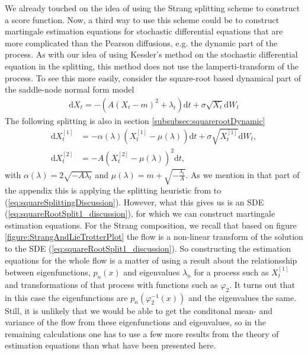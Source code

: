 We already touched on the idea of using the Strang splitting scheme to construct a score function. Now, a third way to use this scheme could be to construct martingale estimation equations for stochastic differential equations that are more complicated than the Pearson diffusions, e.g. the dynamic part of the process. As with our idea of using Kessler's method on the stochastic differential equation in the splitting, this method does not use the lamperti-transform of the process. To see this more easily, consider the square-root based dynamical part of the saddle-node normal form model
\begin{align}
    \mathrm{d}X_t = -(A(X_t - m)^2 + \lambda_t)\mathrm{d}t + \sigma\sqrt{X_t}\mathrm{d}W_t \label{eq:squareSplittingDiscussion}
\end{align}  
The following splitting is also in section \ref{subsubsec:squarerootDynamic}
\begin{align}
    \mathrm{d}X_t^{[1]} &= -\alpha(\lambda)\left(X_t^{[1]} - \mu(\lambda)\right)  \mathrm{d}t + \sigma \sqrt{X_t^{[1]}} \mathrm{d}W_t, \label{eq:squareRootSplit1_discussion} \\
    \mathrm{d}X_t^{[2]} &= - A \left(X_t^{[2]} - \mu(\lambda)\right)^2 \mathrm{d}t, \label{eq:squareRootSplit2_discussion}
\end{align}
with $\alpha(\lambda) = 2\sqrt{-A\lambda_t}$ and $\mu(\lambda) = m + \sqrt{-\frac{\lambda_t}{A}}$. As we mention in that part of the appendix this is applying the splitting heuristic from \cite{SplittingSchemes} to (\ref{eq:squareSplittingDiscussion}). However, what this gives us is an SDE (\ref{eq:squareRootSplit1_discussion}), for which we can construct martingale estimation equations. For the Strang composition, we recall that based on figure \ref{figure:StrangAndLieTrotterPlot} the flow is a non-linear transform of the solution to the SDE (\ref{eq:squareRootSplit1_discussion}). So constructing the estimation equations for the whole flow is a matter of using a result about the relationsship between eigenfunctions, $p_n(x)$ and eigenvalues $\lambda_n$ for a process such as $X_t^{[1]}$ and transformations of that process with functions such as $\varphi_2$. It turns out \cite[remark on p. 41]{StatisticalMethodsForSDE} that in this case the eigenfunctions are $p_n\left(\varphi_2^{-1}(x)\right)$ and the eigenvalues the same. Still, it is unlikely that we would be able to get the conditonal mean- and variance  of the flow from these eigenfunctions and eigenvalues, so in the remaining calculations one has to use a few more results from the theory of estimation equations than what have been presented here.
\newpage
